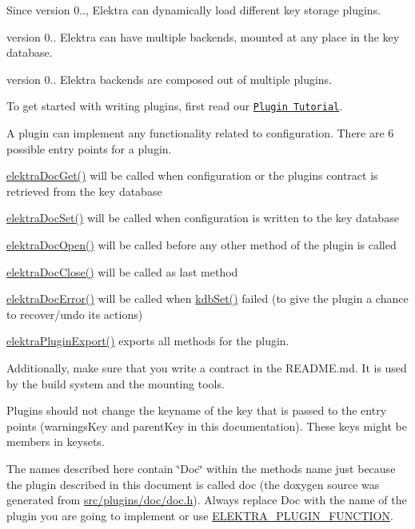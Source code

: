 \begin{DoxySince}{Since}
version 0.., Elektra can dynamically load different key storage plugins.

version 0.. Elektra can have multiple backends, mounted at any place in the key database.

version 0.. Elektra backends are composed out of multiple plugins.
\end{DoxySince}
To get started with writing plugins, first read our \href{doc_tutorials_plugins_md.html}{\tt Plugin Tutorial}.

A plugin can implement any functionality related to configuration. There are 6 possible entry points for a plugin.
\begin{DoxyItemize}
\item \hyperlink{group__plugin_gacb69f3441c6d84241b4362f958fbe313}{elektra\+Doc\+Get()} will be called when configuration or the plugin\textquotesingle{}s contract is retrieved from the key database
\item \hyperlink{group__plugin_gae65781a1deb34efc79c8cb9d9174842c}{elektra\+Doc\+Set()} will be called when configuration is written to the key database
\item \hyperlink{group__plugin_ga23c2eb3584e38a4d494eb8f91e5e3d8d}{elektra\+Doc\+Open()} will be called before any other method of the plugin is called
\item \hyperlink{group__plugin_ga1236aefe5b2baf8b7bf636ba5aa9ea29}{elektra\+Doc\+Close()} will be called as last method
\item \hyperlink{group__plugin_gad74b35f558ac7c3262f6069c5c47dc79}{elektra\+Doc\+Error()} will be called when \hyperlink{group__kdb_ga11436b058408f83d303ca5e996832bcf}{kdb\+Set()} failed (to give the plugin a chance to recover/undo its actions)
\item \hyperlink{group__plugin_ga8dd092048e972a3f0c9c9f54eb41576e}{elektra\+Plugin\+Export()} exports all methods for the plugin.
\end{DoxyItemize}

Additionally, make sure that you write a contract in the R\+E\+A\+D\+M\+E.\+md. It is used by the build system and the mounting tools.

Plugins should not change the keyname of the key that is passed to the entry points (warnings\+Key and parent\+Key in this documentation). These keys might be members in keysets.

The names described here contain \char`\"{}\+Doc\char`\"{} within the method\textquotesingle{}s name just because the plugin described in this document is called doc (the doxygen source was generated from \hyperlink{doc_8h}{src/plugins/doc/doc.\+h}). Always replace Doc with the name of the plugin you are going to implement or use \hyperlink{group__plugin_gacb05c902e4014535589db4193da87460}{E\+L\+E\+K\+T\+R\+A\+\_\+\+P\+L\+U\+G\+I\+N\+\_\+\+F\+U\+N\+C\+T\+I\+ON}.

